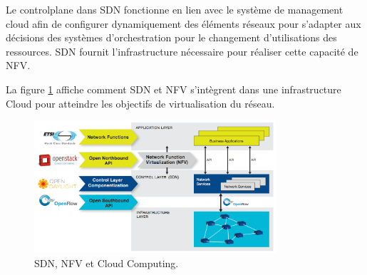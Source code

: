 
Le \gls{controlplane} dans SDN fonctionne en lien avec le système de management cloud afin de configurer dynamiquement des éléments réseaux pour s'adapter aux décisions des systèmes d'orchestration pour le changement d'utilisations des ressources. SDN fournit l'infrastructure nécessaire pour réaliser cette capacité de NFV.

La figure \ref{cloud-sdn-nfv} affiche comment SDN et NFV s'intègrent dans une infrastructure Cloud pour atteindre les objectifs de virtualisation du réseau. \\

\begin{figure}[h]
\begin{center}
\includegraphics[width=0.8\textwidth]{images/cloud-sdn-nfv} 
\caption{SDN, NFV et Cloud Computing. \cite{leveragingSDNCloudNetworkServiceExample}} \label{cloud-sdn-nfv}
\end{center}
\end{figure} 

